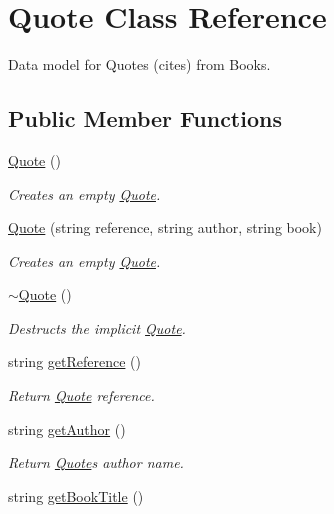 \hypertarget{class_quote}{}\section{Quote Class Reference}
\label{class_quote}


Data model for Quotes (cites) from Books.  


\subsection*{Public Member Functions}
\begin{DoxyCompactItemize}
\item 
\hyperlink{class_quote_ae160077e513fe6346eeba294a195038b}{Quote} ()
\begin{DoxyCompactList}\small\item\em Creates an empty \hyperlink{class_quote}{Quote}. \end{DoxyCompactList}\item 
\hyperlink{class_quote_a12fee26be3fcdf003691e394f256b2c8}{Quote} (string reference, string author, string book)
\begin{DoxyCompactList}\small\item\em Creates an empty \hyperlink{class_quote}{Quote}. \end{DoxyCompactList}\item 
\hyperlink{class_quote_a9b4324f3ee83827f2445177c8301482b}{$\sim$\+Quote} ()
\begin{DoxyCompactList}\small\item\em Destructs the implicit \hyperlink{class_quote}{Quote}. \end{DoxyCompactList}\item 
string \hyperlink{class_quote_ac397baacf75c95f29feb609ece9335f9}{get\+Reference} ()
\begin{DoxyCompactList}\small\item\em Return \hyperlink{class_quote}{Quote} reference. \end{DoxyCompactList}\item 
string \hyperlink{class_quote_a609abf6ab14773bafd6445f50b0cefba}{get\+Author} ()
\begin{DoxyCompactList}\small\item\em Return \hyperlink{class_quote}{Quote}\textquotesingle{}s author name. \end{DoxyCompactList}\item 
string \hyperlink{class_quote_ad571172e7027459ac118b2af4c5abd9e}{get\+Book\+Title} ()

\end{DoxyCompactItemize}
